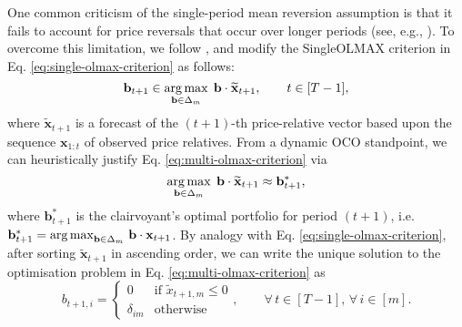 One common criticism of the single-period mean reversion assumption is that it fails to account for price reversals that occur over longer periods (see, e.g., \citep{olmar}). To overcome this limitation, we follow \citet{olmar}, and modify the SingleOLMAX criterion in Eq. \eqref{eq:single-olmax-criterion} as follows:  
\begin{equation}
\label{eq:multi-olmax-criterion}
	\mathbf{b}_{t+1} \in \operatorname*{arg\,max}_{\mathbf{b}\in\Delta_m}\; \mathbf{b} \cdot \widetilde{\mathbf{x}}_{t+1}, \qquad t \in [T-1],
\end{equation}
where $\widetilde{\mathbf{x}}_{t+1}$ is a forecast of the $(t+1)$-th price-relative vector based upon the sequence $\mathbf{x}_{1:t}$ of observed price relatives. From a dynamic OCO standpoint, we can heuristically justify Eq. \eqref{eq:multi-olmax-criterion} via
\begin{equation}
	\operatorname*{arg\,max}_{\mathbf{b}\in\Delta_m}\; \mathbf{b} \cdot \widetilde{\mathbf{x}}_{t+1}
	\approx \mathbf{b}_{t+1}^*,
\end{equation}
where $\mathbf{b}_{t+1}^*$ is the clairvoyant's optimal portfolio for period $(t+1)$, i.e.\ $\mathbf{b}_{t+1}^* = \operatorname*{arg\,max}_{\mathbf{b}\in\Delta_m}\, \mathbf{b} \cdot \mathbf{x}_{t+1}$. By analogy with Eq. \eqref{eq:single-olmax-criterion}, after sorting $\widetilde{\mathbf{x}}_{t+1}$ in ascending order, we can write the unique solution to the optimisation problem in Eq. \eqref{eq:multi-olmax-criterion} as
\begin{equation}
	b_{t+1,i} =
	\begin{cases}
		0 & \text{if } \widetilde{x}_{t+1,m} \leq 0 \\
		\delta_{im} & \text{otherwise}
	\end{cases},
	\qquad \forall\,t \in [T-1],\, \forall\,i \in [m].
\end{equation}

